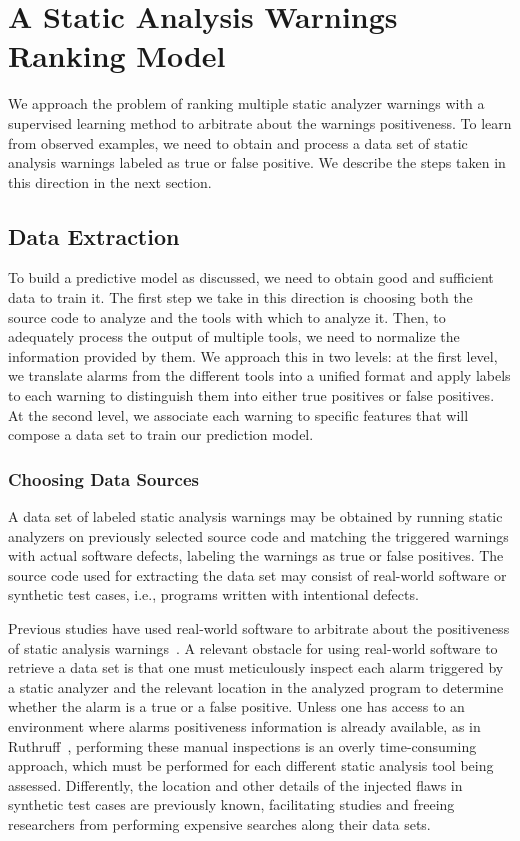 \chapter{A Static Analysis Warnings Ranking Model}
\label{ch:ranking}

We approach the problem of ranking multiple static analyzer warnings with a
supervised learning method to arbitrate about the warnings positiveness. To
learn from observed examples, we need to obtain and process a data set of static
analysis warnings labeled as true or false positive. We describe the steps taken
in this direction in the next section.

\section{Data Extraction}
\label{sec:data}

To build a predictive model as discussed, we need to obtain good and sufficient
data to train it. The first step we take in this direction is choosing both the
source code to analyze and the tools with which to analyze it. Then, to
adequately process the output of multiple tools, we need to normalize the
information provided by them. We approach this in two levels: at the first
level, we translate alarms from the different tools into a unified format and
apply labels to each warning to distinguish them into either true positives or
false positives. At the second level, we associate each warning to specific
features that will compose a data set to train our prediction model.

\subsection{Choosing Data Sources}

A data set of labeled static analysis warnings may be obtained by running
static analyzers on previously selected source code and matching the
triggered warnings with actual software defects, labeling the warnings as true
or false positives. The source code used for extracting the data set may
consist of real-world software or synthetic test cases, i.e., programs written
with intentional defects.

Previous studies have used real-world software to arbitrate about the
positiveness of static analysis warnings~\cite{kremenek2004correlation,
jung2005taming, yoon2014reducing, yuksel2013classification,
ruthruff_predicting_2008}. A relevant obstacle for using real-world software to
retrieve a data set is that one must meticulously inspect each alarm triggered
by a static analyzer and the relevant location in the analyzed program to
determine whether the alarm is a true or a false positive.  Unless one has
access to an environment where alarms positiveness information is already
available, as in Ruthruff~\cite{ruthruff_predicting_2008}, performing these
manual inspections is an overly time-consuming approach, which must be
performed for each different static analysis tool being assessed. Differently,
the location and other details of the injected flaws in synthetic test cases
are previously known, facilitating studies and freeing researchers from
performing expensive searches along their data sets.

